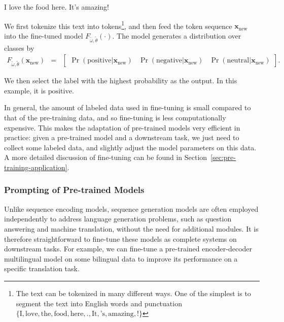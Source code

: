 \begin{center}
I love the food here. It's amazing!
\vspace{0.5em}
\end{center}

\noindent We first tokenize this text into tokens\footnote{The text can be tokenized in many different ways. One of the simplest is to segment the text into English words and punctuation $\{\textrm{I}, \textrm{love}, \textrm{the}, \textrm{food}, \textrm{here}, \textrm{.}, \textrm{It}, \textrm{'s}, \textrm{amazing}, \textrm{!}\}$}, and then feed the token sequence $\mathbf{x}_{\mathrm{new}}$ into the fine-tuned model $F_{\tilde{\omega},\tilde{\theta}}(\cdot)$. The model generates a distribution over classes by
\begin{eqnarray}
F_{\tilde{\omega},\tilde{\theta}}(\mathbf{x}_{\mathrm{new}}) & = & \begin{bmatrix} \Pr(\mathrm{positive}|\mathbf{x}_{\mathrm{new}}) & \Pr(\mathrm{negative}|\mathbf{x}_{\mathrm{new}}) & \Pr(\mathrm{neutral}|\mathbf{x}_{\mathrm{new}})\end{bmatrix}.
\end{eqnarray}

\noindent We then select the label with the highest probability as the output. In this example, it is $\mathrm{positive}$.

In general, the amount of labeled data used in fine-tuning is small compared to that of the pre-training data, and so fine-tuning is less computationally expensive. This makes the adaptation of pre-trained models very efficient in practice: given a pre-trained model and a downstream task, we just need to collect some labeled data, and slightly adjust the model parameters on this data. A more detailed discussion of fine-tuning can be found in Section~\ref{sec:pre-training-application}.

\subsubsection{Prompting of Pre-trained Models}

\noindent Unlike sequence encoding models, sequence generation models are often employed independently to address language generation problems, such as question answering and machine translation, without the need for additional modules. It is therefore straightforward to fine-tune these models as complete systems on downstream tasks. For example, we can fine-tune a pre-trained encoder-decoder multilingual model on some bilingual data to improve its performance on a specific translation task.

